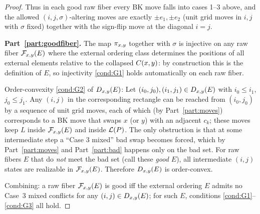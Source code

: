\begin{proof}
Thus in each good raw fiber every BK move falls into cases 1--3 above, and
the allowed $(i,j,\sigma)$-altering moves are exactly
$\pm e_1,\pm e_2$ (unit grid moves in $i,j$ with $\sigma$ fixed) together
with the sign-flip move at the diagonal $i=j$.

\smallskip
\textbf{Part~\ref{part:goodfiber}.}
The map $\pi_{x,y}$ together with $\sigma$ is injective on any raw fiber $\mathcal{F}_{x,y}(E)$
where the external ordering class determines the positions of all external
elements relative to the collapsed $C(x,y)$: by construction this is the
definition of $E$, so injectivity \ref{cond:G1} holds automatically on each
raw fiber.

Order-convexity \ref{cond:G2} of $D_{x,y}(E)$: Let $(i_0,j_0),(i_1,j_1)\in D_{x,y}(E)$
with $i_0\le i_1$, $j_0\le j_1$. Any $(i,j)$ in the corresponding rectangle
can be reached from $(i_0,j_0)$ by a sequence of unit grid moves, each of
which (by Part~\ref{part:moves}) corresponds to a BK move that swaps
$x$ (or $y$) with an adjacent $c_k$; these moves keep $L$ inside $\mathcal{F}_{x,y}(E)$
and inside $\mathcal{L}(P)$. The only obstruction is that at some intermediate step a
``Case 3 mixed'' bad swap becomes forced, which by Part~\ref{part:moves}
and Part~\ref{part:bad} happens only on the bad set.
For raw fibers $E$ that do \emph{not} meet the bad set (call these
\emph{good $E$}), all intermediate $(i,j)$ states are realizable in
$\mathcal{F}_{x,y}(E)$. Therefore $D_{x,y}(E)$ is order-convex.

Combining: a raw fiber $\mathcal{F}_{x,y}(E)$ is good iff the external ordering $E$
admits no Case~3 mixed conflicts for any $(i,j)\in D_{x,y}(E)$; for such $E$,
conditions \ref{cond:G1}--\ref{cond:G3} all hold.


\end{proof}
